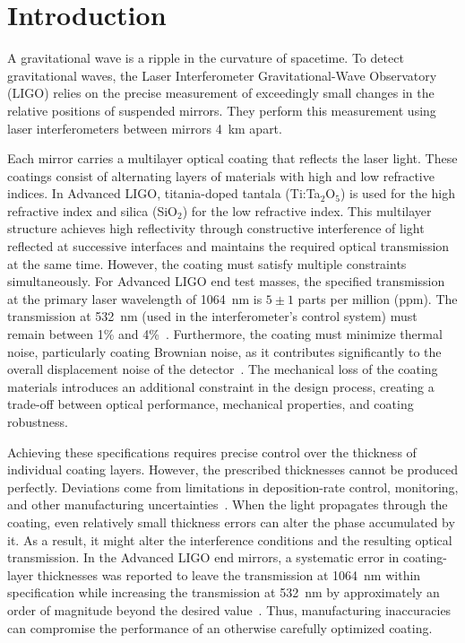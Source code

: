 \section{Introduction}

A gravitational wave is a ripple in the curvature of spacetime. To detect gravitational waves, the Laser Interferometer Gravitational-Wave Observatory (LIGO) relies on the precise measurement of exceedingly small changes in the relative positions of suspended mirrors. They perform this measurement using laser interferometers between mirrors 4~km apart.

Each mirror carries a multilayer optical coating that reflects the laser light. These coatings consist of alternating layers of materials with high and low refractive indices. In Advanced LIGO, titania-doped tantala (Ti:Ta$_2$O$_5$) is used for the high refractive index and silica (SiO$_2$) for the low refractive index. This multilayer structure achieves high reflectivity through constructive interference of light reflected at successive interfaces and maintains the required optical transmission at the same time. However, the coating must satisfy multiple constraints simultaneously. For Advanced LIGO end test masses, the specified transmission at the primary laser wavelength of 1064~nm is $5 \pm 1$ parts per million (ppm). The transmission at 532~nm (used in the interferometer's control system) must remain between 1\% and 4\%~\cite{E0900068}. Furthermore, the coating must minimize thermal noise, particularly coating Brownian noise, as it contributes significantly to the overall displacement noise of the detector~\cite{aLIGO2015,Hong2013}. The mechanical loss of the coating materials introduces an additional constraint in the design process, creating a trade-off between optical performance, mechanical properties, and coating robustness.

Achieving these specifications requires precise control over the thickness of individual coating layers. However, the prescribed thicknesses cannot be produced perfectly. Deviations come from limitations in deposition-rate control, monitoring, and other manufacturing uncertainties~\cite{Tikhonravov2012}. When the light propagates through the coating, even relatively small thickness errors can alter the phase accumulated by it. As a result, it might alter the interference conditions and the resulting optical transmission. In the Advanced LIGO end mirrors, a systematic error in coating-layer thicknesses was reported to leave the transmission at 1064~nm within specification while increasing the transmission at 532~nm by approximately an order of magnitude beyond the desired value~\cite{aLIGO2015}. Thus, manufacturing inaccuracies can compromise the performance of an otherwise carefully optimized coating.

